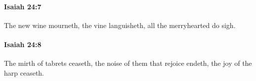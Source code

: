 		\paragraph{Isaiah 24:7} %
			\label{ISAIAH-24-7}

			The new wine mourneth, the vine languisheth, all the merryhearted do sigh.


		\paragraph{Isaiah 24:8} %
			\label{ISAIAH-24-8}

			The mirth of tabrets ceaseth, the noise of them that rejoice endeth, the joy of the harp ceaseth.


